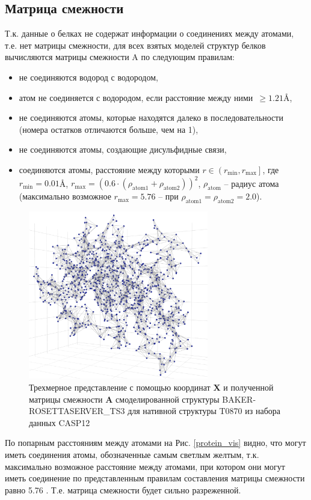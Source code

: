 \documentclass[14pt]{extarticle}
\begin{document}
\subsection{Матрица смежности}
Т.к. данные о белках не содержат информации о соединениях между атомами, т.е. нет матрицы смежности, для всех взятых моделей структур белков вычисляются матрицы смежности A по следующим правилам:
\begin{itemize}
	\item не соединяются водород с водородом,
	\item атом не соединяется с водородом, если расстояние между ними~$\geq 1.21$\AA,
	\item не соединяются атомы, которые находятся далеко в последовательности (номера остатков отличаются больше, чем на 1),
	\item не соединяются атомы, создающие дисульфидные связи,
	\item соединяются атомы, расстояние между которыми $r\in \left(r_\text{min}, r_\text{max}\right]$, где $r_\text{min} = 0.01$\AA, $r_\text{max} = \left(0.6\cdot(\rho_\text{atom1}+\rho_\text{atom2})\right)^2$, $\rho_\text{atom}$ -- радиус атома (максимально возможное $r_\text{max} = 5.76$ -- при $\rho_\text{atom1} = \rho_\text{atom2} = 2.0$).
\end{itemize}


\begin{figure}[H]
	\centering
	\includegraphics[width=0.7\textwidth]{3d_graph.pdf}
	\caption{Трехмерное представление с помощью координат $\textbf{X}$ и полученной матрицы смежности $\textbf{A}$ смоделированной структуры BAKER-ROSETTASERVER\_TS3 для нативной структуры T0870 из набора данных CASP12}
	\label{fig:3Dgraph}
\end{figure}
По попарным расстояниям между атомами на Рис. \ref{protein_vis} видно, что могут иметь соединения атомы, обозначенные самым светлым желтым, т.к. максимально возможное расстояние между атомами, при котором они могут иметь соединение по представленным правилам составления матрицы смежности равно 5.76 . Т.е. матрица смежности будет сильно разреженной.
\end{document}
